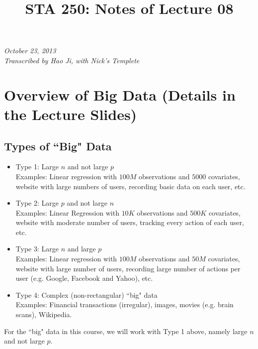 \documentclass[article]{memoir}
\title{STA 250: Notes of Lecture 08}
\DeclareMathOperator{\1}{\mathbf{1}}
\theoremstyle{definition}
\begin{document}
    \begin{center}
    \textsl{October 23, 2013} \\
    \textsl{Transcribed by Hao Ji, with Nick's Templete}
    \end{center}
\chapter{Overview of Big Data (Details in the Lecture Slides)}

\section{Types of ``Big" Data}
\begin{itemize}
\item Type 1: Large $n$ and not large $p$\\
Examples: Linear regression with $100M$ observations and $5000$ covariates, website with large numbers of users, recording basic data on each user, etc.
\item Type 2: Large $p$ and not large $n$\\
Examples: Linear Regression with $10K$ observations and $500K$ covariates, website with moderate number of users, tracking every action of each user, etc.
\item Type 3: Large $n$ and large $p$\\
Examples: Linear regression with $100M$ observations and $50M$ covariates, website with large number of users, recording large number of actions per user (e.g. Google, Facebook and Yahoo), etc.
\item Type 4: Complex (non-rectangular) ``big" data\\
Examples: Financial transactions (irregular), images, movies (e.g. brain scans), Wikipedia.
\end{itemize}

For the ``big" data in this course, we will work with Type 1 above, namely large $n$ and not large $p$.
\end{document}
